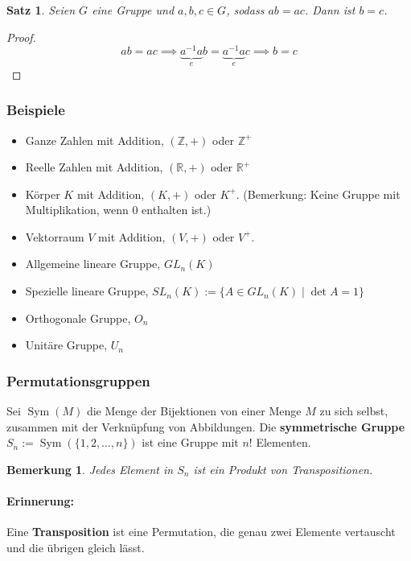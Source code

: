 \documentclass{article}
\theoremstyle{plain}
\newtheorem{theorem}{Satz}
\newtheorem{bemerkung}{Bemerkung}
\newcommand{\defn}[1]{\textbf{#1}}
\newcommand{\defeq}{:=}
\newcommand{\R}{\mathbb{R}}
\newcommand{\Z}{\mathbb{Z}}
\newcommand{\sym}{\mathop{\text{Sym}}}
\begin{document}
\begin{theorem}
    Seien $G$ eine Gruppe und $a,b,c\in G$, sodass $ab=ac$. Dann ist $b=c$.
\end{theorem}
\begin{proof}
    $$ab=ac\implies \underbrace{a^{-1}a}_{e}b = \underbrace{a^{-1}a}_{e}c\implies b=c$$
\end{proof}

\subsubsection*{Beispiele}
\begin{itemize}
    \item Ganze Zahlen mit Addition, $(\Z, +)$ oder $\Z^+$
    \item Reelle Zahlen mit Addition, $(\R, +)$ oder $\R^+$
    \item Körper $K$ mit Addition, $(K, +)$ oder $K^+$. (Bemerkung: Keine Gruppe mit Multiplikation, wenn 0 enthalten ist.)
    \item Vektorraum $V$ mit Addition, $(V, +)$ oder $V^+$.
    \item Allgemeine lineare Gruppe, $GL_n(K)$
    \item Spezielle lineare Gruppe, $SL_n(K) \defeq \{A\in GL_n(K)\mid \det A=1\}$
    \item Orthogonale Gruppe, $O_n$
    \item Unitäre Gruppe, $U_n$
\end{itemize}

\subsubsection*{Permutationsgruppen}
Sei $\sym(M)$ die Menge der Bijektionen von einer Menge $M$ zu sich selbst, zusammen mit der Verknüpfung von Abbildungen.
Die \defn{symmetrische Gruppe} $S_n\defeq \sym(\{1,2,\ldots,n\})$ ist eine Gruppe mit $n!$ Elementen.
\begin{bemerkung}
    Jedes Element in $S_n$ ist ein Produkt von Transpositionen.
\end{bemerkung}
\paragraph{Erinnerung:} Eine \defn{Transposition} ist eine Permutation, die genau zwei Elemente vertauscht und die übrigen gleich lässt.
\end{document}
